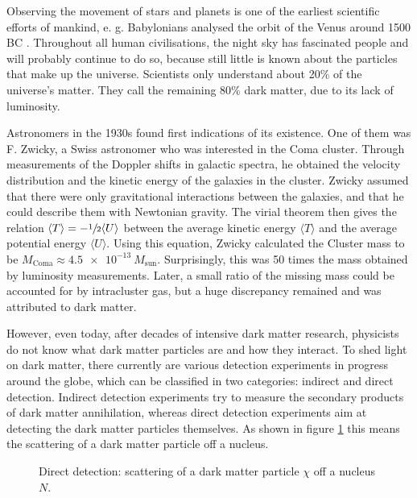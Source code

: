 Observing the movement of stars and planets is one of the earliest scientific efforts of mankind, e. g. Babylonians analysed the orbit of the Venus around 1500 BC \cite{History}. Throughout all human civilisations, the night sky has fascinated people and will probably continue to do so, because still little is known about the particles that make up the universe. Scientists only understand about 20\% of the universe's matter. They call the remaining 80\% dark matter, due to its lack of \mbox{luminosity. \cite{DM}}


Astronomers in the 1930s found first indications of its existence. One of them was F. Zwicky, a Swiss astronomer who was interested in the Coma cluster. Through measurements of the Doppler shifts in galactic spectra, he obtained the velocity distribution and the kinetic energy of the galaxies in the cluster. Zwicky assumed that there were only gravitational interactions between the galaxies, and that he could describe them with Newtonian gravity. The virial theorem then gives the relation $\langle T\rangle = -\sfrac{1}{2}\langle U\rangle$ between the average kinetic energy $\langle T\rangle$ and the average potential energy $\langle U\rangle$. Using this equation, Zwicky calculated the Cluster mass to be $M_\text{Coma} \approx \SI{4.5e-13}{}M_\text{sun}$. Surprisingly, this was 50 times the mass obtained by luminosity measurements. Later, a small ratio of the missing mass could be accounted for by intracluster gas, but a huge discrepancy remained and was attributed to dark matter. \cite{DM}


\begin{minipage}{0.55\textwidth}
	However, even today, after decades of intensive dark matter research, physicists do not know what dark matter particles are and how they interact. To shed light on dark matter, there currently are various detection experiments in progress around the globe, which can be classified in two categories: indirect and direct detection. Indirect detection experiments try to measure the secondary products of dark matter annihilation, whereas direct detection experiments aim at detecting the dark matter particles themselves. As shown in figure \ref{fig:DirectDetection} this means the scattering of a dark matter particle off a nucleus.
\end{minipage} \hfill
\begin{minipage}{0.4\textwidth}
	\begin{figure}[H]
		\resizebox{\textwidth}{!}{
			
		}
		\captionsetup{width=\textwidth}
		\caption{Direct detection: scattering of a dark matter particle $\chi$ off a nucleus $N$.}
		\label{fig:DirectDetection}
	\end{figure}
\end{minipage}



